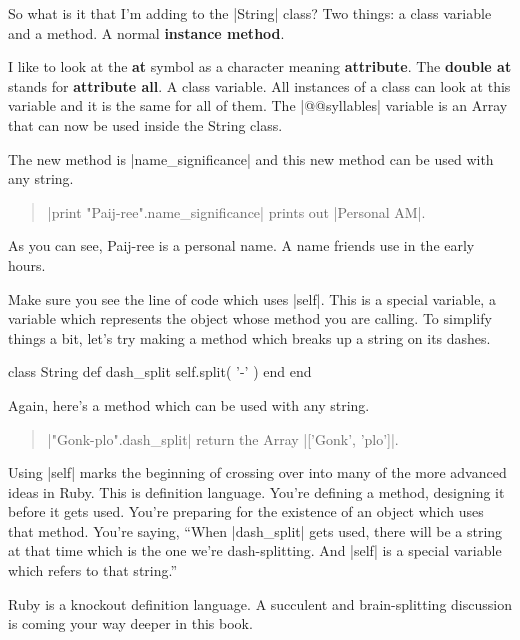 \documentclass[12pt,twoside]{report}
\begin{document}
So what is it that I'm adding to the
\rubyinline|String| class?  Two things: a class
variable and a method.  A normal {\bf instance method}.

I like to look at the {\bf at} symbol as a character meaning {\bf
  attribute}.  The {\bf double at} stands for {\bf attribute all}.  A
class variable.  All instances of a class can look at this variable
and it is the same for all of them.  The
\rubyinline|@@syllables| variable is an Array that can
now be used inside the String class.

The new method is \rubyinline|name_significance| and
this new method can be used with any string.

\begin{quote}
\rubyinline|print "Paij-ree".name_significance| prints
out \rubyinline|Personal AM|.\end{quote}


As you can see, Paij-ree is a personal name.  A name friends use in
the early hours.

Make sure you see the line of code which uses
\rubyinline|self|.  This is a special variable, a
variable which represents the object whose method you are calling.  To
simplify things a bit, let's try making a method which breaks up a
string on its dashes.


\begin{rubycode}

 class String
   def dash_split
     self.split( '-' )
   end
 end

\end{rubycode}


Again, here's a method which can be used with any string.

\begin{quote}
\rubyinline|"Gonk-plo".dash_split| return the Array
\rubyinline|['Gonk', 'plo']|.\end{quote}


Using \rubyinline|self| marks the beginning of
crossing over into many of the more advanced ideas in Ruby. This is
definition language.  You're defining a method, designing it before it
gets used.  You're preparing for the existence of an object which uses
that method.  You're saying, ``When
\rubyinline|dash_split| gets used, there will be a
string at that time which is the one we're dash-splitting.  And
\rubyinline|self| is a special variable which refers
to that string.''

Ruby is a knockout definition language.  A succulent and
brain-splitting discussion is coming your way deeper in this book.
\end{document}
